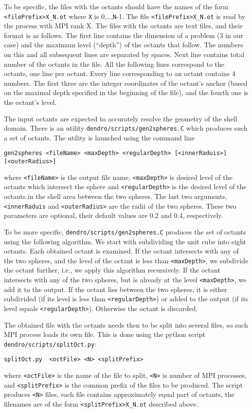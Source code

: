 \documentclass[12pt,reqno,a4paper]{report}
\numberwithin{equation}{section}
\begin{document}
To be specific, the files with the octants should have the names of the form \verb?<filePrefix>X_N.ot? where \verb?X? is 0,\dots,\verb|N|-1. The file \verb?<filePrefix>X_N.ot? is read by the process with MPI rank X. The files with the octants are text files, and their format is as follows. The first line contains the dimension of a problem (3 in our case) and the maximum level (``depth'') of the octants that follow. The numbers on this and all subsequent lines are separated by spaces. Next line contains total number of the octants in the file. All the following lines correspond to the octants, one line per octant. Every line corresponding to an octant contains 4 numbers. The first three are the integer coordinates of the octant's anchor (based on the maximal depth specified in the beginning of the file), and the fourth one is the octant's level.

The input octants are expected to accurately resolve the geometry of the shell domain.
There is an utility \verb'dendro/scripts/gen2spheres.C' which produces such a set of octants. The utility is launched using the command line
\begin{verbatim}
gen2spheres <fileName> <maxDepth> <regularDepth> [<innerRaduis>] 
[<outerRadius>]
\end{verbatim}
where \verb|<fileName>| is the output file name, \verb|<maxDepth>| is desired level of the octants which intersect the sphere and \verb|<regularDepth>| is the desired level of the octants in the shell area between the two spheres. The last two arguments, \verb|<innerRaduis| and \verb|<outerRadius>| are the radii of the two spheres. These two parameters are optional, their default values are 0.2 and 0.4, respectively.

To be more specific, \verb'dendro/scripts/gen2spheres.C' produces the set of octants using the following algorithm. We start with subdividing the unit cube into eight octants. Each obtained octant is
examined. If the octant intersects with any of the two spheres, and the level of the
octant is less than \verb|<maxDepth>|, we subdivide the octant further, i.e., we apply this algorithm recursively. If the octant
intersects with any of the two spheres, but is already at the level \verb|<maxDepth>|, we add it to
the output. If the octant lies between the two spheres, it is either
subdivided (if its level is less than \verb|<regularDepth>|) or added to the output (if its
level equals \verb|<regularDepth>|).  Otherwise the octant is discarded.

The obtained file with the octants needs then to be split into several files, so each MPI process loads its own file. This is done using the python script \verb'dendro/scripts/splitOct.py':
\begin{verbatim}
splitOct.py  <octFile> <N> <splitPrefix>
\end{verbatim}
where \verb|<octFile>| is the name of the file to split, \verb|<N>| is number of MPI processes, and  \verb|<splitPrefix>| is the common prefix of the files to be produced. The script produces \verb|<N>| files, each file contains approximately equal part of octants, the filenames are of the form \verb?<splitPrefix>X_N.ot? described above.
\end{document}
